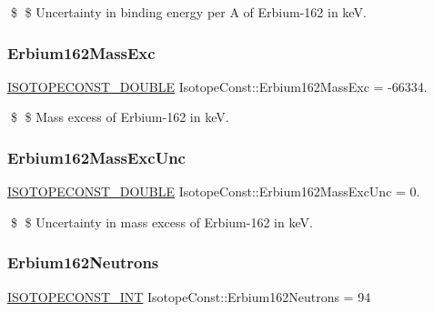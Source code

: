 \$ \$ Uncertainty in binding energy per A of Erbium-\/162 in keV. \mbox{\label{group___isotope_const-_erbium-_er162_gaeec286f625eea60524ae6a159b431800}} 
\subsubsection{\texorpdfstring{Erbium162\+Mass\+Exc}{Erbium162MassExc}}
{\footnotesize\ttfamily \mbox{\hyperlink{group___isotope_const-_macros_ga8f45a7272ce02c0b4c65c44636ed719a}{I\+S\+O\+T\+O\+P\+E\+C\+O\+N\+S\+T\+\_\+\+D\+O\+U\+B\+LE}} Isotope\+Const\+::\+Erbium162\+Mass\+Exc = -\/66334.}

\$ \$ Mass excess of Erbium-\/162 in keV. \mbox{\label{group___isotope_const-_erbium-_er162_gab5e689c42b1be768a7a08909b84b5be2}} 
\subsubsection{\texorpdfstring{Erbium162\+Mass\+Exc\+Unc}{Erbium162MassExcUnc}}
{\footnotesize\ttfamily \mbox{\hyperlink{group___isotope_const-_macros_ga8f45a7272ce02c0b4c65c44636ed719a}{I\+S\+O\+T\+O\+P\+E\+C\+O\+N\+S\+T\+\_\+\+D\+O\+U\+B\+LE}} Isotope\+Const\+::\+Erbium162\+Mass\+Exc\+Unc = 0.}

\$ \$ Uncertainty in mass excess of Erbium-\/162 in keV. \mbox{\label{group___isotope_const-_erbium-_er162_gab9d3fde578f1aef556beb3719797b45d}} 
\subsubsection{\texorpdfstring{Erbium162\+Neutrons}{Erbium162Neutrons}}
{\footnotesize\ttfamily \mbox{\hyperlink{group___isotope_const-_macros_ga5f18360b3e99483a35c32d789e62621c}{I\+S\+O\+T\+O\+P\+E\+C\+O\+N\+S\+T\+\_\+\+I\+NT}} Isotope\+Const\+::\+Erbium162\+Neutrons = 94}

